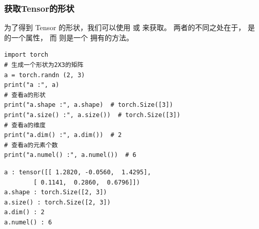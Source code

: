 \subsubsection{获取Tensor的形状}
\label{subsubsec:Pytorch获取Tensor的形状}
为了得到 Tensor 的形状，我们可以使用  或  来获取。
两者的不同之处在于， 是  的一个属性，
而  则是一个  拥有的方法。

\begin{lstlisting}[style=pythonstyle]
import torch
# 生成一个形状为2X3的矩阵
a = torch.randn (2, 3)
print("a :", a)
# 查看a的形状
print("a.shape :", a.shape)  # torch.Size([3])
print("a.size() :", a.size())  # torch.Size([3])
# 查看a的维度
print("a.dim() :", a.dim())  # 2
# 查看a的元素个数
print("a.numel() :", a.numel())  # 6
\end{lstlisting}
\begin{lstlisting}[style=demostyle,numbers=none]
a : tensor([[ 1.2820, -0.0560,  1.4295],
        [ 0.1141,  0.2860,  0.6796]])
a.shape : torch.Size([2, 3])
a.size() : torch.Size([2, 3])
a.dim() : 2
a.numel() : 6
\end{lstlisting}    

